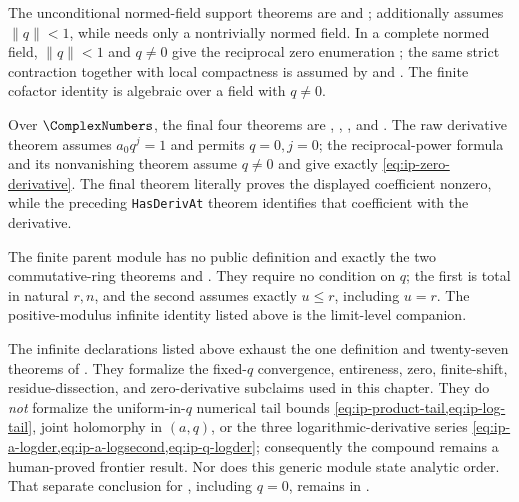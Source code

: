 The unconditional normed-field support theorems are
 and
;
 additionally assumes
\(\lVert q\rVert<1\), while
 needs only a nontrivially
normed field.  In a complete normed field, \(\lVert q\rVert<1\) and
\(q\ne0\) give the reciprocal
zero enumeration
; the same strict
contraction together with local compactness is assumed by
 and
.  The finite cofactor identity
 is algebraic over a
field with \(q\ne0\).

Over \(\ComplexNumbers\), the final four theorems are
,
,
, and
.  The raw derivative
theorem assumes \(a_0q^j=1\) and permits \(q=0,j=0\); the reciprocal-power
formula and its nonvanishing theorem assume \(q\ne0\) and give exactly
\cref{eq:ip-zero-derivative}.  The final theorem literally proves the
displayed coefficient nonzero, while the preceding \texttt{HasDerivAt}
theorem identifies that coefficient with the derivative.

The finite parent module  has no public
definition and exactly the two commutative-ring theorems
 and
.  They require no
condition on \(q\); the first is total in natural \(r,n\), and the second
assumes exactly \(u\le r\), including \(u=r\).  The positive-modulus
infinite identity listed above is the limit-level companion.

The infinite declarations listed above exhaust the one definition and
twenty-seven theorems of
.  They formalize the fixed-\(q\) convergence,
entireness, zero, finite-shift, residue-dissection, and zero-derivative
subclaims used in this chapter.  They do \emph{not} formalize the
uniform-in-\(q\) numerical tail bounds
\cref{eq:ip-product-tail,eq:ip-log-tail}, joint holomorphy in \((a,q)\), or the
three logarithmic-derivative series
\cref{eq:ip-a-logder,eq:ip-a-logsecond,eq:ip-q-logder}; consequently the
compound  remains a human-proved frontier
result.  Nor does this generic module state analytic order.  That separate
conclusion for , including \(q=0\), remains
 in
.

